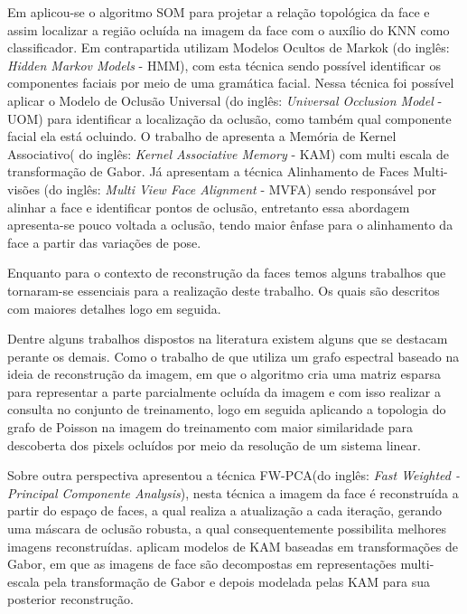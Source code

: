 Em  aplicou-se o algoritmo SOM para projetar a relação topológica da face e assim localizar a região ocluída na imagem da face com o auxílio do KNN como classificador. Em contrapartida  utilizam Modelos Ocultos de Markok (do inglês: \textit{Hidden Markov Models} - HMM), com esta técnica sendo possível identificar os componentes faciais por meio de uma gramática facial. Nessa técnica foi possível aplicar o Modelo de Oclusão Universal (do inglês: \textit{Universal Occlusion Model} - UOM)  para identificar a localização da oclusão, como também qual componente facial ela está ocluindo. O trabalho de  apresenta a Memória de Kernel Associativo( do inglês: \textit{Kernel Associative Memory} - KAM) com multi escala de transformação de Gabor. Já  apresentam a técnica Alinhamento de Faces Multi-visões (do inglês: \textit{Multi View Face Alignment }- MVFA) sendo responsável por alinhar a face e identificar pontos de oclusão, entretanto essa abordagem apresenta-se pouco voltada a oclusão, tendo maior ênfase para o alinhamento da face a partir das variações de pose.

Enquanto para o contexto de reconstrução da faces temos alguns trabalhos que tornaram-se essenciais para a realização deste trabalho. Os quais são descritos com maiores detalhes logo em seguida.




Dentre alguns trabalhos dispostos na literatura existem alguns que se destacam perante os demais. Como o trabalho de  que utiliza um grafo espectral baseado na ideia de reconstrução da imagem, em que o algoritmo cria uma matriz esparsa para representar a parte parcialmente ocluída da imagem e com isso realizar a consulta no conjunto de treinamento, logo em seguida aplicando a topologia do grafo de Poisson na imagem do treinamento com maior similaridade para descoberta dos pixels ocluídos por meio da resolução de um sistema linear.

Sobre outra perspectiva   apresentou a técnica FW-PCA(do inglês: \textit{Fast Weighted - Principal Componente Analysis}), nesta técnica a imagem da face é reconstruída a partir do espaço de faces, a qual realiza a atualização a cada iteração, gerando uma máscara de oclusão robusta, a qual  consequentemente possibilita melhores imagens reconstruídas.  aplicam modelos de KAM baseadas em transformações de Gabor, em que as imagens de face são decompostas em representações multi-escala pela transformação de Gabor e depois modelada pelas KAM para sua posterior reconstrução. 

